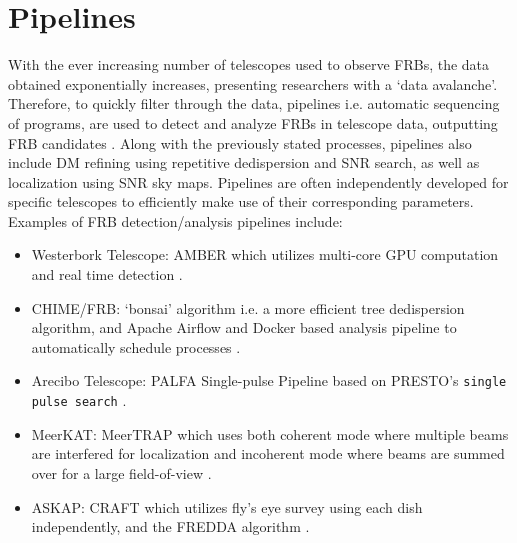 \section{Pipelines}


With the ever increasing number of telescopes used to observe FRBs, the data obtained exponentially increases, presenting researchers with a `data avalanche'. Therefore, to quickly filter through the data, pipelines i.e. automatic sequencing of programs, are used to detect and analyze FRBs in telescope data, outputting FRB candidates \cite{Petroff_Hessels_Lorimer_2019}. Along with the previously stated processes, pipelines also include DM refining using repetitive dedispersion and SNR search, as well as localization using SNR sky maps. Pipelines are often independently developed for specific telescopes to efficiently make use of their corresponding parameters. Examples of FRB detection/analysis pipelines include:
\begin{itemize}
    \item Westerbork Telescope: AMBER which utilizes multi-core GPU computation and real time detection \cite{Sclocco2020}.
    \item CHIME/FRB: `bonsai' algorithm i.e. a more efficient tree dedispersion algorithm, and Apache Airflow and Docker based analysis pipeline to automatically schedule processes \cite{Chime2018, Michilli2021}.
    \item Arecibo Telescope: PALFA Single-pulse Pipeline based on PRESTO's \texttt{single pulse search} \cite{Patel2018}.
    \item MeerKAT: MeerTRAP which uses both coherent mode where multiple beams are interfered for localization and incoherent mode where beams are summed over for a large field-of-view \cite{Sanidas2017}.
    \item ASKAP: CRAFT which utilizes fly's eye survey using each dish independently, and the FREDDA algorithm \cite{James2019}.
\end{itemize}